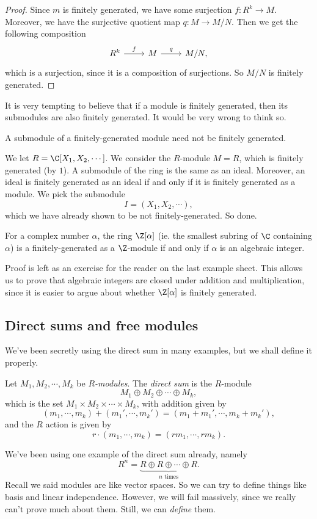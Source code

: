 \documentclass[a4paper]{article}
\begin{document}
\begin{proof}
  Since $m$ is finitely generated, we have some surjection $f: R^k \to M$. Moreover, we have the surjective quotient map $q: M \to M/N$. Then we get the following composition
  \[
    \begin{tikzcd}
      R^k \ar[r, "f"] & M \ar[r, "q"] & M/N,
    \end{tikzcd}
  \]
  which is a surjection, since it is a composition of surjections. So $M/N$ is finitely generated.
\end{proof}

It is very tempting to believe that if a module is finitely generated, then its submodules are also finitely generated. It would be very wrong to think so.

\begin{eg}
  A submodule of a finitely-generated module need not be finitely generated.

  We let $R = \C[X_1, X_2, \cdots]$. We consider the $R$-module $M = R$, which is finitely generated (by $1$). A submodule of the ring is the same as an ideal. Moreover, an ideal is finitely generated as an ideal if and only if it is finitely generated as a module. We pick the submodule
  \[
    I = (X_1, X_2, \cdots),
  \]
  which we have already shown to be not finitely-generated. So done.
\end{eg}

\begin{eg}
  For a complex number $\alpha$, the ring $\Z[\alpha]$ (ie. the smallest subring of $\C$ containing $\alpha$) is a finitely-generated as a $\Z$-module if and only if $\alpha$ is an algebraic integer.

  Proof is left as an exercise for the reader on the last example sheet. This allows us to prove that algebraic integers are closed under addition and multiplication, since it is easier to argue about whether $\Z[\alpha]$ is finitely generated.
\end{eg}

\subsection{Direct sums and free modules}
We've been secretly using the direct sum in many examples, but we shall define it properly.

\begin{defi}
  Let $M_1, M_2, \cdots, M_k$ be \emph{$R$-modules}. The \emph{direct sum} is the $R$-module
  \[
    M_1 \oplus M_2 \oplus \cdots \oplus M_k,
  \]
  which is the set $M_1 \times M_2 \times \cdots \times M_k$, with addition given by
  \[
    (m_1, \cdots, m_k) + (m_1', \cdots, m_k') = (m_1 + m_1', \cdots, m_k + m_k'),
  \]
  and the $R$ action is given by
  \[
    r\cdot (m_1, \cdots, m_k) = (rm_1, \cdots, rm_k).
  \]
\end{defi}
We've been using one example of the direct sum already, namely
\[
  R^n = \underbrace{R \oplus R \oplus \cdots \oplus R}_{n\text{ times}}.
\]
Recall we said modules are like vector spaces. So we can try to define things like basis and linear independence. However, we will fail massively, since we really can't prove much about them. Still, we can \emph{define} them.
\end{document}
